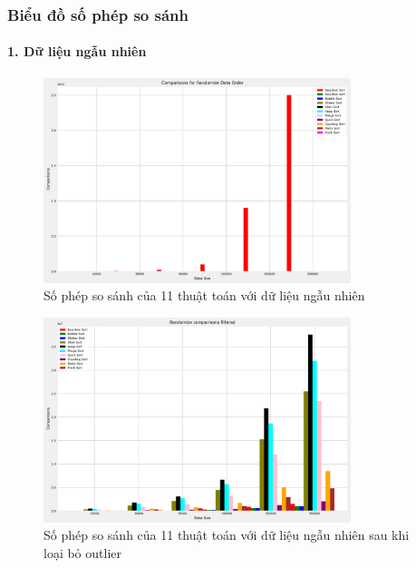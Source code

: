 \subsubsection{Biểu đồ số phép so sánh}


\paragraph{1. Dữ liệu ngẫu nhiên}
\begin{figure}[H]
    \centering
    \includegraphics[width=0.8\textwidth]{img/results/randomize_comparisons.png}
    \caption{Số phép so sánh của 11 thuật toán với dữ liệu ngẫu nhiên}
\end{figure}

\begin{figure}[H]
    \centering
    \includegraphics[width=0.8\textwidth]{img/results/randomize_comparisons_filtered.png}
    \caption{Số phép so sánh của 11 thuật toán với dữ liệu ngẫu nhiên sau khi loại bỏ outlier}
\end{figure}



